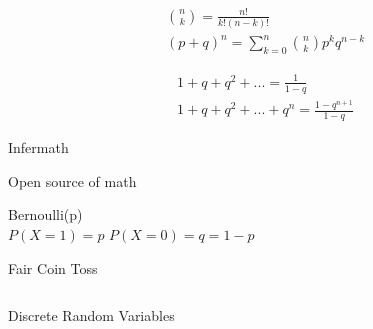 \documentclass[20pt,xcolor={dvipsnames}]{beamer}
\begin{document}
\begin{frame}[c]

\begin{align*}
&{n \choose k}=\frac{n!}{k!(n-k)!} \\
&(p+q)^n = \sum_{k=0}^{n}{n \choose k}p^{k}q^{n-k} 
\end{align*}

\end{frame}

\begin{frame}[c]

\begin{align*}
& 1+q+q^2+... = \frac{1}{1-q} \\ 
& 1+q+q^2+...+q^n = \frac{1-q^{n+1}}{1-q} 
\end{align*}

\end{frame}

\begin{frame}[c]

\centering


\vspace{-1cm}

\Huge Infermath

\normalsize Open source of math 

\end{frame}

\begin{frame}[c]

\centering

\large Bernoulli(p) \\

$P(X=1)= p$
$P(X=0) = q = 1-p$

\vspace{1cm}



\end{frame}

\begin{frame}

\vspace{-1cm}
\hspace{-0.5cm}
\Huge Fair Coin Toss

\vspace{1cm}

\begin{columns}

Discrete Random Variables


\end{columns}

\end{frame}
\end{document}
